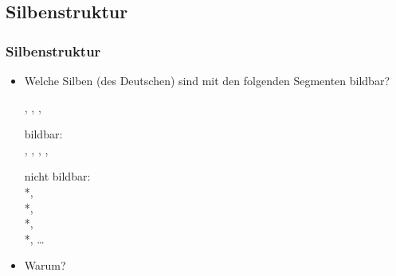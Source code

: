 \subsection{Silbenstruktur}
%
\begin{frame}
\frametitle{Silbenstruktur}

\begin{itemize}
	\item Welche Silben (des Deutschen) sind mit den folgenden Segmenten bildbar?

\ea \textipa{[p]}, \textipa{[a]}, \textipa{[l]}, \textipa{[t]}
\z

\pause	

\eal
	\ex bildbar:\\
	\textipa{[palt]}, \textipa{[alpt]}, \textipa{[lapt]}, \textipa{[talp]}, \textipa{[plat]}

\pause

	\ex nicht bildbar:\\
	*\textipa{[ltap]}, \\
	*\textipa{[lpat]},\\
	*\textipa{[ptla]}, \\
	*\textipa{[tpal]}, \ldots \\
\zl

\pause

\item Warum?

\end{itemize}

\end{frame}




